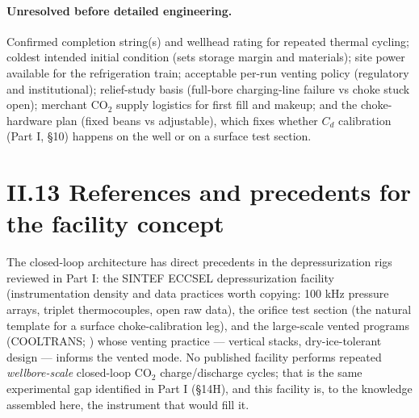 \paragraph{Unresolved before detailed engineering.} Confirmed
completion string(s) and wellhead rating for repeated thermal
cycling; coldest intended initial condition (sets storage margin and
materials); site power available for the refrigeration train;
acceptable per-run venting policy (regulatory and institutional);
relief-study basis (full-bore charging-line failure vs choke stuck
open); merchant CO$_2$ supply logistics for first fill and makeup;
and the choke-hardware plan (fixed beans vs adjustable), which fixes
whether $C_d$ calibration (Part I, \S 10) happens on the well or on a
surface test section.

\section{II.13 References and precedents for the facility concept}

The closed-loop architecture has direct precedents in the
depressurization rigs reviewed in Part I: the SINTEF ECCSEL
depressurization facility \citep{munkejord2020, munkejord2021}
(instrumentation density and data practices worth copying: 100 kHz
pressure arrays, triplet thermocouples, open raw data), the
\citet{hammer2022} orifice test section (the natural template for a
surface choke-calibration leg), and the large-scale vented programs
(COOLTRANS; \citealp{cosham2012}) whose venting practice ---
vertical stacks, dry-ice-tolerant design --- informs the vented mode.
No published facility performs repeated \emph{wellbore-scale}
closed-loop CO$_2$ charge/discharge cycles; that is the same
experimental gap identified in Part I (\S 14H), and this facility is,
to the knowledge assembled here, the instrument that would fill it.
